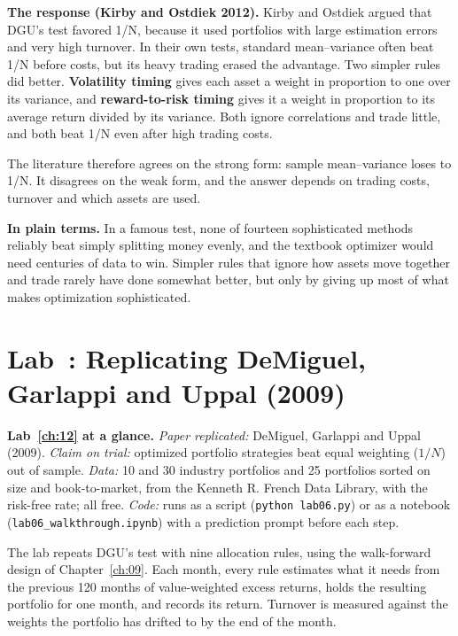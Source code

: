 \textbf{The response (Kirby and Ostdiek 2012).} Kirby and Ostdiek argued that DGU's test favored 1/N, because it used portfolios with large estimation errors and very high turnover. In their own tests, standard mean--variance often beat 1/N before costs, but its heavy trading erased the advantage. Two simpler rules did better. \textbf{Volatility timing} gives each asset a weight in proportion to one over its variance, and \textbf{reward-to-risk timing} gives it a weight in proportion to its average return divided by its variance. Both ignore correlations and trade little, and both beat 1/N even after high trading costs.

The literature therefore agrees on the strong form: sample mean--variance loses to 1/N. It disagrees on the weak form, and the answer depends on trading costs, turnover and which assets are used.

\noindent\textbf{In plain terms.} In a famous test, none of fourteen sophisticated methods reliably beat simply splitting money evenly, and the textbook optimizer would need centuries of data to win. Simpler rules that ignore how assets move together and trade rarely have done somewhat better, but only by giving up most of what makes optimization sophisticated.

\section{Lab~\thechapter: Replicating DeMiguel, Garlappi and Uppal (2009)}
\label{sec:12-lab}

\begin{callout}
\textbf{Lab~\ref{ch:12} at a glance.} \emph{Paper replicated:} DeMiguel, Garlappi and Uppal (2009). \emph{Claim on trial:} optimized portfolio strategies beat equal weighting ($1/N$) out of sample. \emph{Data:} 10 and 30 industry portfolios and 25 portfolios sorted on size and book-to-market, from the Kenneth R. French Data Library, with the risk-free rate; all free. \emph{Code:} runs as a script (\texttt{python lab06.py}) or as a notebook (\texttt{lab06\_walkthrough.ipynb}) with a prediction prompt before each step.
\end{callout}

The lab repeats DGU's test with nine allocation rules, using the walk-forward design of Chapter~\ref{ch:09}. Each month, every rule estimates what it needs from the previous 120 months of value-weighted excess returns, holds the resulting portfolio for one month, and records its return. Turnover is measured against the weights the portfolio has drifted to by the end of the month.

